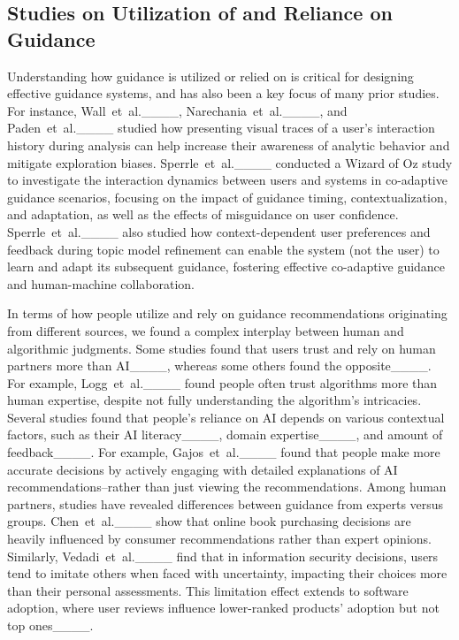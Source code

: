 \subsection{Studies on Utilization of and Reliance on Guidance}
Understanding how guidance is utilized or relied on is critical for designing effective guidance systems, and has also been a key focus of many prior studies.
For instance, 
Wall~et~al.____, Narechania~et~al.____, and Paden~et~al.____ studied how presenting visual traces of a user's interaction history during analysis can help increase their awareness of analytic behavior and mitigate exploration biases.
Sperrle~et~al.____ conducted a Wizard of Oz study to investigate the interaction dynamics between users and systems in co-adaptive guidance scenarios, focusing on the impact of guidance timing, contextualization, and adaptation, as well as the effects of misguidance on user confidence.
Sperrle~et~al.____ also studied how context-dependent user preferences and feedback during topic model refinement can enable the system (not the user) to learn and adapt its subsequent guidance, fostering effective co-adaptive guidance and human-machine collaboration.

In terms of how people utilize and rely on guidance recommendations originating from different sources, we found a complex interplay between human and algorithmic judgments.
Some studies found that users trust and rely on human partners more than AI____, whereas some others found the opposite____.
For example, Logg~et~al.____ found people often trust algorithms more than human expertise, despite not fully understanding the algorithm's intricacies.
Several studies found that people's reliance on AI depends on various contextual factors, such as their AI literacy____, domain expertise____, and amount of feedback____.
For example, Gajos~et~al.____ found that people make more accurate decisions by actively engaging with detailed explanations of AI recommendations--rather than just viewing the recommendations.
Among human partners, studies have revealed differences between guidance from experts versus groups.
Chen~et~al.____ show that online book purchasing decisions are heavily influenced by consumer recommendations rather than expert opinions. Similarly, Vedadi~et~al.____ find that in information security decisions, users tend to imitate others when faced with uncertainty, impacting their choices more than their personal assessments. This limitation effect extends to software adoption, where user reviews influence lower-ranked products' adoption but not top ones____.

